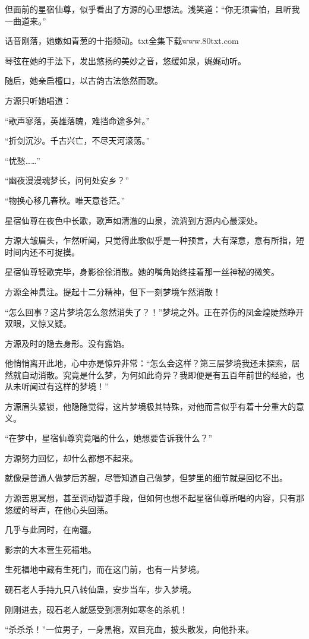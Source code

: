 \begin{this_body}
但面前的星宿仙尊，似乎看出了方源的心里想法。浅笑道：“你无须害怕，且听我一曲道来。”

话音刚落，她嫩如青葱的十指频动。txt全集下载www.80txt.com

琴弦在她的手法下，发出悠扬的美妙之音，悠缓如泉，娓娓动听。

随后，她亲启檀口，以古韵古法悠然而歌。

方源只听她唱道：

“歌声寥落，英雄落魄，难挡命途多舛。”

“折剑沉沙。千古兴亡，不尽天河滚荡。”

“忧愁……”

“幽夜漫漫魂梦长，问何处安乡？”

“物换心移几春秋。唯天意苍茫。”

星宿仙尊在夜色中长歌，歌声如清澈的山泉，流淌到方源内心最深处。

方源大皱眉头，乍然听闻，只觉得此歌似乎是一种预言，大有深意，意有所指，短时间内还不可捉摸。

星宿仙尊轻歌完毕，身影徐徐消散。她的嘴角始终挂着那一丝神秘的微笑。

方源全神贯注。提起十二分精神，但下一刻梦境乍然消散！

“怎么回事？这片梦境怎么忽然消失了？！”梦境之外。正在养伤的凤金煌陡然睁开双眼，又惊又疑。

方源及时的隐去身形。没有露馅。

他悄悄离开此地，心中亦是惊异非常：“怎么会这样？第三层梦境我还未探索，居然就自动消散。究竟是什么梦，为何如此奇异？我即便是有五百年前世的经验，也从未听闻过有这样的梦境！”

方源眉头紧锁，他隐隐觉得，这片梦境极其特殊，对他而言似乎有着十分重大的意义。

“在梦中，星宿仙尊究竟唱的什么，她想要告诉我什么？”

方源努力回忆，却什么都想不起来。

就像是普通人做梦后苏醒，尽管知道自己做梦，但梦里的细节就是回忆不出。

方源苦思冥想，甚至调动智道手段，但如何也想不起星宿仙尊所唱的内容，只有那悠缓的琴声，在他心头回荡。

几乎与此同时，在南疆。

影宗的大本营生死福地。

生死福地中藏有生死门，而在这门前，也有一片梦境。

砚石老人手持九只八转仙蛊，安步当车，步入梦境。

刚刚进去，砚石老人就感受到凛冽如寒冬的杀机！

“杀杀杀！”一位男子，一身黑袍，双目充血，披头散发，向他扑来。


\end{this_body}
